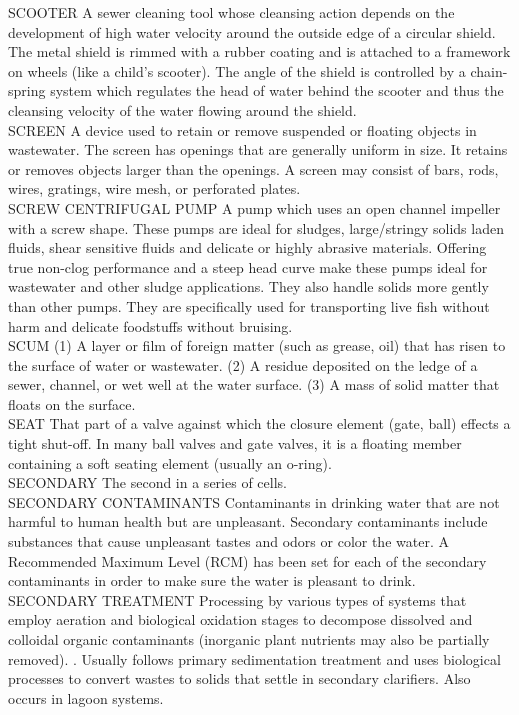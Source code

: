 \documentclass{article}
\begin{document}
SCOOTER
A sewer cleaning tool whose cleansing action depends on the development of high water velocity around the outside edge of a circular shield. The metal shield is rimmed with a rubber coating and is attached to a framework on wheels (like a child’s scooter). The angle of the shield is controlled by a chain-spring system which regulates the head of water behind the scooter and thus the cleansing velocity of the water flowing around the shield. 
\vspace{0.3cm}\\
SCREEN
A device used to retain or remove suspended or floating objects in wastewater. The screen has openings that are generally uniform in size. It retains or removes objects larger than the openings. A screen may consist of bars, rods, wires, gratings, wire mesh, or perforated plates.
\vspace{0.3cm}\\
SCREW CENTRIFUGAL PUMP
A pump which uses an open channel impeller with a screw shape. These pumps are ideal for sludges, large/stringy solids laden fluids, shear sensitive fluids and delicate or highly abrasive materials. Offering true non-clog performance and a steep head curve make these pumps ideal for wastewater and other sludge applications. They also handle solids more gently than other pumps. They are specifically used for transporting live fish without harm and delicate foodstuffs without bruising.
\vspace{0.3cm}\\
SCUM
(1) A layer or film of foreign matter (such as grease, oil) that has risen to the surface of water or wastewater. (2) A residue deposited on the ledge of a sewer, channel, or wet well at the water surface. (3) A mass of solid matter that floats on the surface. 
\vspace{0.3cm}\\
SEAT
That part of a valve against which the closure element (gate, ball) effects a tight shut-off. In many ball valves and gate valves, it is a floating member containing a soft seating element (usually an o-ring).
\vspace{0.3cm}\\
SECONDARY
The second in a series of cells.
\vspace{0.3cm}\\
SECONDARY CONTAMINANTS
Contaminants in drinking water that are not harmful to human health but are unpleasant. Secondary contaminants include substances that cause unpleasant tastes and odors or color the water. A Recommended Maximum Level (RCM) has been set for each of the secondary contaminants in order to make sure the water is pleasant to drink.
\vspace{0.3cm}\\
SECONDARY TREATMENT
Processing by various types of systems that employ aeration and biological oxidation stages to decompose dissolved and colloidal organic contaminants (inorganic plant nutrients may also be partially removed). . Usually follows primary sedimentation treatment and uses biological processes to convert wastes to solids that settle in secondary clarifiers. Also occurs in lagoon systems.
\vspace{0.3cm}\\
\end{document}
